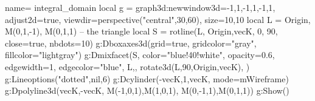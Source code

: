 \documentclass[border=5pt]{standalone}%
\begin{document}
\begin{luadraw}{name= integral_domain}
local g = graph3d:new{window3d={-1,1,-1,1,-1,1}, adjust2d=true, 
    viewdir=perspective("central",30,60), size={10,10}}
local L = {Origin, M(0,1,-1), M(0,1,1)} -- the triangle
local S = rotline(L, {Origin,vecK}, 0, 90, {close=true, nbdots=10})
g:Dboxaxes3d({grid=true, gridcolor="gray", fillcolor="lightgray"})
g:Dmixfacet(S, {color="blue!40!white", opacity=0.6, edgewidth=1, edgecolor="blue"}, L,{}, rotate3d(L,90,{Origin,vecK}), {})
g:Lineoptions("dotted",nil,6)
g:Dcylinder(-vecK,1,vecK, {mode=mWireframe})
g:Dpolyline3d({{vecK,-vecK}, {M(-1,0,1),M(1,0,1)}, {M(0,-1,1),M(0,1,1)}})
g:Show() 
\end{luadraw}
\end{document}

